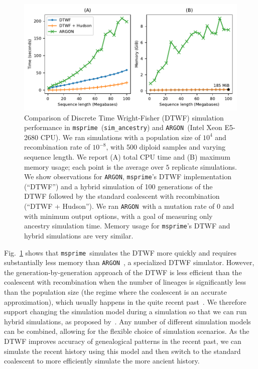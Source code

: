 \documentclass[9pt,twocolumn,twoside,lineno]{gsajnl}
\newcommand{\msprime}[0]{\texttt{msprime}}
\newcommand{\ARGON}[0]{\texttt{ARGON}}
\begin{document}
\begin{figure}
\begin{center}
\includegraphics{figures/dtwf-perf}
\end{center}
\caption{\label{fig-dtwf-perf} Comparison of Discrete Time Wright-Fisher
(DTWF) simulation performance in \msprime\ (\texttt{sim\_ancestry})
and \ARGON\ (Intel Xeon E5-2680 CPU).
We ran simulations with a population size of $10^4$ and
recombination rate of $10^{-8}$, with 500 diploid samples
and varying sequence length.
We report (A) total CPU time and (B) maximum memory usage;
each point is the average over $5$ replicate simulations.
We show observations for \ARGON, \msprime's DTWF implementation (``DTWF'')
and a hybrid simulation of 100 generations of the DTWF followed by
the standard coalescent with recombination (``DTWF + Hudson'').
We ran \ARGON\ with a mutation rate of $0$ and with minimum output options,
with a goal of measuring only ancestry simulation time.
Memory usage for \msprime's DTWF and hybrid simulations are very similar.
}
\end{figure}

Fig.~\ref{fig-dtwf-perf} shows that \msprime\ simulates the DTWF
more quickly and requires substantially less memory than
\ARGON~\citep{palamara2016argon}, a specialized DTWF simulator.
However, the generation-by-generation approach of the DTWF is less
efficient than the coalescent with recombination when the
number of lineages is significantly less than the population size
(the regime where the coalescent is an accurate approximation),
which usually happens in the quite recent
past~\citep{bhaskar2014distortion}.
We therefore support changing the simulation model during a simulation
so that we can run hybrid simulations, as proposed by~\cite{bhaskar2014distortion}.
Any number of different simulation models can be combined, allowing for the
flexible choice of simulation scenarios.
As the DTWF improves accuracy of genealogical
patterns in the recent past, we can simulate the recent history using this
model and then switch to the standard coalescent to more efficiently simulate
the more ancient history.
\end{document}
